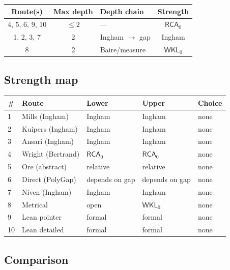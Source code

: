 \documentclass[11pt,reqno]{amsart}
\theoremstyle{redplain}
\numberwithin{equation}{section}
\begin{document}
\begin{center}
{\small 
\begin{tabular}{|c|c|m{3.4cm}|c|}
\hline
\textbf{Route(s)} & \textbf{Max depth} & \textbf{Depth chain} & \textbf{%
Strength} \\ \hline
4, 5, 6, 9, 10 & $\le2$ & --- & $\mathsf{RCA}_0$ \\ \hline
1, 2, 3, 7 & 2 & Ingham $\to$ gap & Ingham \\ \hline
8 & 2 & Baire/measure & $\mathsf{WKL}_0$ \\ \hline
\end{tabular}
}
\end{center}

\subsection{Strength map}

\begin{center}
{\small 
\begin{tabular}{|m{0.6cm}|m{4.6cm}|m{1.4cm}|m{1.4cm}|m{1.4cm}|}
\hline
\textbf{\#} & \textbf{Route} & \textbf{Lower} & \textbf{Upper} & \textbf{%
Choice} \\ \hline
1 & Mills (Ingham) & Ingham & Ingham & none \\ \hline
2 & Kuipers (Ingham) & Ingham & Ingham & none \\ \hline
3 & Ansari (Ingham) & Ingham & Ingham & none \\ \hline
4 & Wright (Bertrand) & $\mathsf{RCA}_0$ & $\mathsf{RCA}_0$ & none \\ \hline
5 & Ore (abstract) & relative & relative & none \\ \hline
6 & Direct (PolyGap) & depends on gap & depends on gap & none \\ \hline
7 & Niven (Ingham) & Ingham & Ingham & none \\ \hline
8 & Metrical & open & $\mathsf{WKL}_0$ & none \\ \hline
9 & Lean pointer & formal & formal & none \\ \hline
10 & Lean detailed & formal & formal & none \\ \hline
\end{tabular}
}
\end{center}

\subsection{Comparison}
\end{document}
